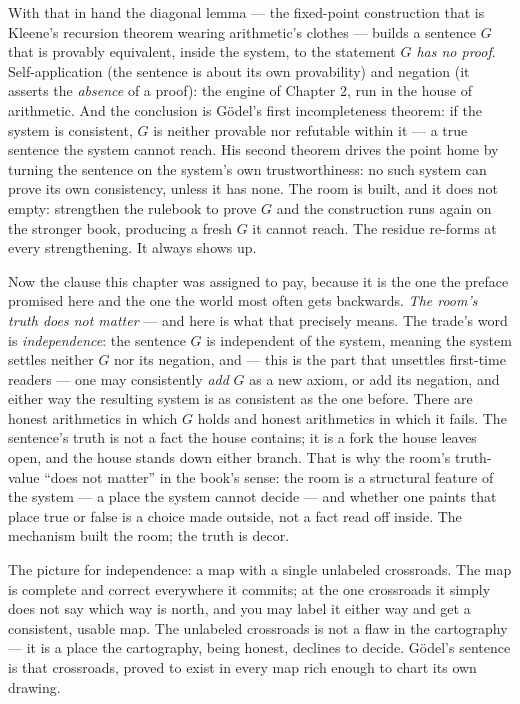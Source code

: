 With that in hand the diagonal lemma --- the fixed-point construction
that is Kleene's recursion theorem wearing arithmetic's clothes --- builds
a sentence $G$ that is provably equivalent, inside the system, to the
statement \emph{$G$ has no proof}. Self-application (the sentence is about
its own provability) and negation (it asserts the \emph{absence} of a
proof): the engine of Chapter 2, run in the house of arithmetic. And the
conclusion is G\"odel's first incompleteness theorem: if the system is
consistent, $G$ is neither provable nor refutable within it --- a true
sentence the system cannot reach. His second theorem drives the point
home by turning the sentence on the system's own trustworthiness: no such
system can prove its own consistency, unless it has none. The room is
built, and it does not empty: strengthen the rulebook to prove $G$ and the
construction runs again on the stronger book, producing a fresh $G$ it
cannot reach. The residue re-forms at every strengthening. It always
shows up.

Now the clause this chapter was assigned to pay, because it is the one the
preface promised here and the one the world most often gets backwards.
\emph{The room's truth does not matter} --- and here is what that
precisely means. The trade's word is \emph{independence}: the sentence
$G$ is independent of the system, meaning the system settles neither $G$
nor its negation, and --- this is the part that unsettles first-time
readers --- one may consistently \emph{add} $G$ as a new axiom, or add its
negation, and either way the resulting system is as consistent as the one
before. There are honest arithmetics in which $G$ holds and honest
arithmetics in which it fails. The sentence's truth is not a fact the
house contains; it is a fork the house leaves open, and the house stands
down either branch. That is why the room's truth-value ``does not
matter'' in the book's sense: the room is a structural feature of the
system --- a place the system cannot decide --- and whether one paints
that place true or false is a choice made outside, not a fact read off
inside. The mechanism built the room; the truth is decor.

\begin{intuition}
The picture for independence: a map with a single unlabeled crossroads.
The map is complete and correct everywhere it commits; at the one
crossroads it simply does not say which way is north, and you may label
it either way and get a consistent, usable map. The unlabeled crossroads
is not a flaw in the cartography --- it is a place the cartography, being
honest, declines to decide. G\"odel's sentence is that crossroads, proved
to exist in every map rich enough to chart its own drawing.
\end{intuition}

